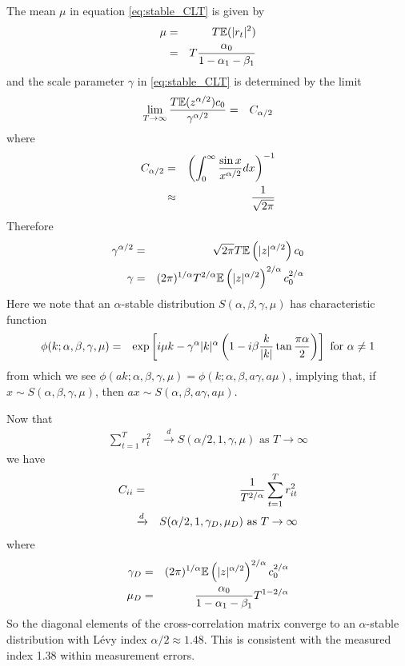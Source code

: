 \documentclass{report}
\begin{document}
The mean $\mu$ in equation \ref{eq:stable_CLT} is given by
\begin{eqnarray*}
  \mu &=& T \mathbb{E}(|r_t|^2) \\
  &=& T{\alpha_0 \over 1 - \alpha_1 - \beta_1}
\end{eqnarray*}
and the scale parameter $\gamma$ in \ref{eq:stable_CLT} is determined
by the limit \cite{Bilik2008}
\begin{eqnarray*}
  \lim_{T\to\infty} {T \mathbb{E}(z^{\alpha/2}) c_0 \over \gamma^{\alpha/2}}
  &=& C_{\alpha/2}
\end{eqnarray*}
where
\begin{eqnarray*}
  C_{\alpha/2} &=& \left( \int_0^\infty {\sin x \over x^{\alpha/2}} dx
  \right)^{-1} \\
  &\approx& {1 \over \sqrt{2 \pi}}
\end{eqnarray*}
Therefore
\begin{eqnarray*}
  \gamma^{\alpha/2} &=& \sqrt{2\pi} T \mathbb{E}\left(
    |z|^{\alpha/2}
  \right) c_0 \\
  \gamma &=& (2\pi)^{1/\alpha} T^{2/\alpha} \mathbb{E}\left(
    |z|^{\alpha/2}
  \right)^{2/\alpha} c_0^{2/\alpha}
\end{eqnarray*}
Here we note that an $\alpha$-stable distribution $S(\alpha, \beta,
\gamma, \mu)$ has characteristic function \cite{Guhr2007}
\begin{eqnarray*}
  \phi(k; \alpha, \beta, \gamma, \mu) &=& \exp\left[
    i\mu k - \gamma^\alpha |k|^\alpha \left(
      1 - i \beta {k \over |k|} \tan{\pi \alpha \over 2}
    \right) \right] \text{ for $\alpha \neq 1$}
\end{eqnarray*}
from which we see $\phi(ak; \alpha, \beta, \gamma, \mu) = \phi(k;
\alpha, \beta, a\gamma, a\mu)$, implying that, if $x \sim S(\alpha,
\beta, \gamma, \mu)$, then $ax \sim S(\alpha, \beta, a\gamma, a\mu)$.

Now that
\begin{eqnarray*}
  \sum_{t=1}^T r_t^2 &\xrightarrow{d} S(\alpha/2,
  1, \gamma, \mu) \text{ as $T \to \infty$}  
\end{eqnarray*}
we have
\begin{eqnarray*}
  C_{ii} &=& {1 \over T^{2/\alpha}}\sum_{t=1}^T r_{it}^2 \\
  &\xrightarrow{d}&
  S(\alpha/2, 1, \gamma_D, \mu_D) \text{ as $T \to \infty$}
\end{eqnarray*}
where
\begin{eqnarray}\label{eq:garch_wishart_cij_params}
  \gamma_D &=& (2\pi)^{1/\alpha} \mathbb{E}\left(|z|^{\alpha/2}
  \right)^{2/\alpha} c_0^{2/\alpha} \\
  \mu_D &=& {\alpha_0 \over 1 - \alpha_1 - \beta_1} T^{1 - 2/\alpha}
  \nonumber
\end{eqnarray}
So the diagonal elements of the cross-correlation matrix converge to
an $\alpha$-stable distribution with L\'evy index $\alpha/2 \approx
1.48$. This is consistent with the measured index 1.38 within
measurement errors.
\end{document}
